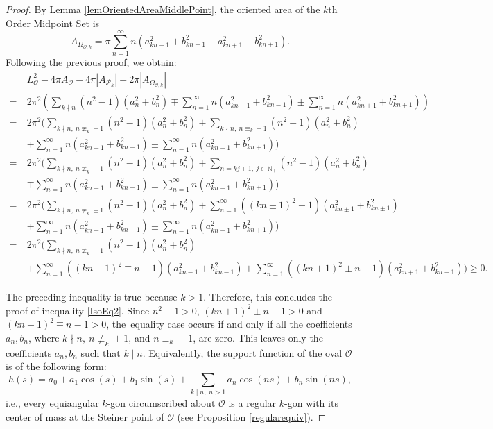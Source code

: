 \documentclass{amsart}
\theoremstyle{definition}
\numberwithin{equation}{section}
\begin{document}
\begin{proof}
By Lemma \ref{lemOrientedAreaMiddlePoint}, the oriented area of the $k$th Order Midpoint Set is
$$A_{\Omega_{\mathcal{O},k}} = \pi \sum_{n=1}^\infty n(a^2_{kn-1}+b^2_{kn-1}-a^2_{kn+1}-b^2_{kn+1}).$$
    Following the previous proof, we obtain:
    {\small\begin{align*}
        & L_{\mathcal{O}}^2 - 4\pi A_{\mathcal{O}} - 4\pi |A_{\mathcal{P}_k}| - 2\pi|A_{\Omega_{\mathcal{O},k}}| \\= \ &2\pi^2\left(\sum_{k \nmid n} (n^2-1)(a_{n}^2 + b_{n}^2) \mp \sum_{n=1}^\infty n\left(a^2_{kn-1}+b^2_{kn-1}\right)\pm\sum_{n=1}^\infty n\left(a^2_{kn+1}+b^2_{kn+1}\right)\right)\\=\ & 2\pi^2\Bigg(\sum_{k \nmid n,\ n\not \equiv_k\pm 1} (n^2-1)(a_{n}^2 + b_{n}^2) +\sum_{k \nmid n,\ n\equiv_k\pm 1} (n^2-1)(a_{n}^2 + b_{n}^2)\\ & \mp \sum_{n=1}^\infty n\left(a^2_{kn-1}+b^2_{kn-1}\right)\pm\sum_{n=1}^\infty n\left(a^2_{kn+1}+b^2_{kn+1}\right)\Bigg)\\=\ & 2\pi^2\Bigg(\sum_{k \nmid n,\ n\not \equiv_k\pm 1} (n^2-1)(a_{n}^2 + b_{n}^2) +\sum_{n=kj\pm 1,\ j\in \mathbb{N}_+} (n^2-1)(a_{n}^2 + b_{n}^2)\\ & \mp \sum_{n=1}^\infty n\left(a^2_{kn-1}+b^2_{kn-1}\right)\pm\sum_{n=1}^\infty n\left(a^2_{kn+1}+b^2_{kn+1}\right)\Bigg)\\=\ & 2\pi^2\Bigg(\sum_{k \nmid n,\ n\not \equiv_k\pm 1} (n^2-1)(a_{n}^2 + b_{n}^2) +\sum_{n=1} ^\infty((kn\pm 1)^2-1)(a_{kn\pm 1}^2 + b_{kn\pm 1}^2)\\ & \mp \sum_{n=1}^\infty n\left(a^2_{kn-1}+b^2_{kn-1}\right)\pm\sum_{n=1}^\infty n\left(a^2_{kn+1}+b^2_{kn+1}\right)\Bigg)\\=\ & 2\pi^2\Bigg(\sum_{k \nmid n,\ n\not \equiv_k\pm 1} (n^2-1)(a_{n}^2 + b_{n}^2) \\ & + \sum_{n=1}^\infty ((kn-1)^2\mp n-1)\left(a^2_{kn-1}+b^2_{kn-1}\right)+\sum_{n=1}^\infty ((kn+1)^2\pm n-1)\left(a^2_{kn+1}+b^2_{kn+1}\right)\Bigg) \geqslant 0.\end{align*}}
        
        \noindent The preceding inequality is true because $k>1$. Therefore, this concludes the proof of inequality \eqref{IsoEq2}. Since $n^2-1>0$, $(kn+1)^2\pm n-1>0$ and $(kn-1)^2\mp n-1 > 0$, the~equality case occurs if and only if all the coefficients  $a_n, b_n$, where $k\nmid n,\ n\not \equiv_k\pm 1$, and $n \equiv_k\pm 1$, are zero. This leaves only the coefficients $a_n,b_n$ such that $k \mid n$. Equivalently, the support function of the oval $\mathcal{O}$ is of the following form:
    $$h(s) = a_0 +a_1\cos(s) + b_1\sin(s)+ \sum_{k\mid n, \;n>1}a_n\cos(ns) + b_n\sin(ns),$$
    i.e., every equiangular $k$-gon circumscribed about $\mathcal{O}$ is a regular $k$-gon with its center of mass at the Steiner point of $\mathcal{O}$ (see Proposition \ref{regularequiv}).
\end{proof}
\end{document}
